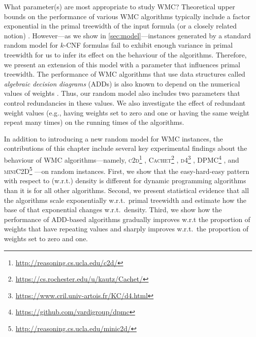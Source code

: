 What parameter(s) are most appropriate to study WMC\@? Theoretical upper bounds
on the performance of various WMC algorithms typically include a factor
exponential in the primal treewidth of the input formula (or a closely related
notion)
\citep{DBLP:journals/jair/BacchusDP09,DBLP:journals/jacm/Darwiche01,DBLP:conf/ecai/Darwiche04,DBLP:conf/sat/SangBBKP04}.
However---as we show in \cref{sec:model}---instances generated by a standard
random model for $k$-CNF formulas fail to exhibit enough variance in primal
treewidth for us to infer its effect on the behaviour of the algorithms.
Therefore, we present an extension of this model with a parameter that
influences primal treewidth. The performance of WMC algorithms that use data
structures called \emph{algebraic decision diagrams} (ADDs)
\citep{DBLP:journals/fmsd/BaharFGHMPS97} is also known to depend on the
numerical values of weights
\citep{DBLP:conf/aaai/DudekPV20,DBLP:conf/cp/DudekPV20}. Thus, our random model
also includes two parameters that control redundancies in these values. We also
investigate the effect of redundant weight values (e.g., having weights set to
zero and one or having the same weight repeat many times) on the running times
of the algorithms.

In addition to introducing a new random model for WMC instances, the
contributions of this chapter include several key experimental findings about
the behaviour of WMC algorithms---namely,
\textsc{c2d}\footnote{\url{http://reasoning.cs.ucla.edu/c2d/}}
\citep{DBLP:conf/ecai/Darwiche04},
\textsc{Cachet}\footnote{\url{https://cs.rochester.edu/u/kautz/Cachet/}}
\citep{DBLP:conf/sat/SangBBKP04},
\textsc{d4}\footnote{\url{https://www.cril.univ-artois.fr/KC/d4.html}}
\citep{DBLP:conf/ijcai/LagniezM17},
\textsc{DPMC}\footnote{\url{https://github.com/vardigroup/dpmc}}
\citep{DBLP:conf/cp/DudekPV20}, and
\textsc{miniC2D}\footnote{\url{http://reasoning.cs.ucla.edu/minic2d/}}
\citep{DBLP:conf/ijcai/OztokD15}---on random instances. First, we show that the
easy-hard-easy pattern with respect to (w.r.t.) density is different for dynamic
programming algorithms than it is for all other algorithms. Second, we present
statistical evidence that all the algorithms scale exponentially w.r.t.\ primal
treewidth and estimate how the base of that exponential changes w.r.t.\ density.
Third, we show how the performance of ADD-based algorithms gradually improves
w.r.t the proportion of weights that have repeating values and sharply improves
w.r.t.\ the proportion of weights set to zero and one.

